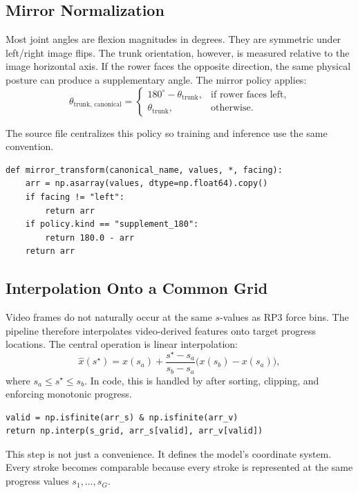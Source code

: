 \documentclass[11pt]{article}
\newcommand{\code}[1]{\texttt{\detokenize{#1}}}
\begin{document}
\subsection{Mirror Normalization}

Most joint angles are flexion magnitudes in degrees. They are symmetric under
left/right image flips. The trunk orientation, however, is measured relative to
the image horizontal axis. If the rower faces the opposite direction, the same
physical posture can produce a supplementary angle. The mirror policy applies:
\[
  \theta_{\text{trunk, canonical}} =
  \begin{cases}
    180^\circ - \theta_{\text{trunk}}, & \text{if rower faces left},\\
    \theta_{\text{trunk}}, & \text{otherwise}.
  \end{cases}
\]

The source file \code{feature_contract.py} centralizes this policy so training
and inference use the same convention.

\begin{lstlisting}
def mirror_transform(canonical_name, values, *, facing):
    arr = np.asarray(values, dtype=np.float64).copy()
    if facing != "left":
        return arr
    if policy.kind == "supplement_180":
        return 180.0 - arr
    return arr
\end{lstlisting}

\subsection{Interpolation Onto a Common Grid}

Video frames do not naturally occur at the same \(s\)-values as RP3 force bins.
The pipeline therefore interpolates video-derived features onto target progress
locations. The central operation is linear interpolation:
\[
  \hat{x}(s^\star) =
  x(s_a) +
  \frac{s^\star-s_a}{s_b-s_a}
  \bigl(x(s_b)-x(s_a)\bigr),
\]
where \(s_a \le s^\star \le s_b\). In code, this is handled by
\code{np.interp} after sorting, clipping, and enforcing monotonic progress.

\begin{lstlisting}
valid = np.isfinite(arr_s) & np.isfinite(arr_v)
return np.interp(s_grid, arr_s[valid], arr_v[valid])
\end{lstlisting}

This step is not just a convenience. It defines the model's coordinate system.
Every stroke becomes comparable because every stroke is represented at the same
progress values \(s_1,\ldots,s_G\).
\end{document}
